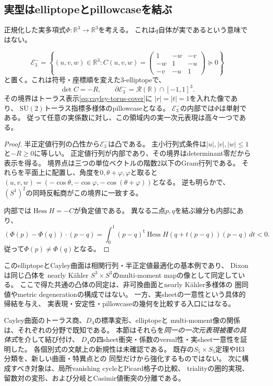 \subsection{実型はelliptopeとpillowcaseを結ぶ}
正規化した実多項式$\Phi:\mathbb R^3\to\mathbb R^3$を考える。
これは$q$自体が実であるという意味ではない。
\begin{proposition}[相関行列の凸領域と一意な実sheet]
\label{prop:elliptope-gradient-injective}
\[
 \mathcal E_3^-=
 \left\{(u,v,w)\in\mathbb R^3:
 C(u,v,w)=\begin{pmatrix}1&-w&-v\\-w&1&-u\\-v&-u&1\end{pmatrix}\succeq0\right\}
\]
と置く。これは符号・座標順を変えた$3$-elliptopeで、
\[
 \det C=-R,\qquad
 \partial\mathcal E_3^-=\mathcal R(\mathbb R)\cap[-1,1]^3.
\]
その境界はトーラス表示\eqref{eq:cayley-torus-cover}に
$|r|=|t|=1$を入れた像であり、
$\mathrm{SU}(2)$トーラス指標多様体のpillowcaseとなる。
$\mathcal E_3^-$の内部では$\Phi$は単射である。
従って任意の実係数に対し、この領域内の実一次元表現は高々一つである。
\end{proposition}
\begin{proof}
半正定値行列の凸性から$\mathcal E_3^-$は凸である。
主小行列式条件は$|u|,|v|,|w|\le1$と$-R\ge0$に等しい。
正定値行列が内部であり、その境界はdeterminant零だから表示を得る。
境界点は三つの単位ベクトルの階数$2$以下のGram行列である。
それらを平面上に配置し、角度を$0,\theta+\varphi,\varphi$と取ると
$(u,v,w)=(-\cos\theta,-\cos\varphi,-\cos(\theta+\varphi))$となる。
逆も明らかで、$(S^1)^2$の同時反転商がこの境界に一致する。

内部では$\operatorname{Hess}H=-C$が負定値である。
異なる二点$p,q$を結ぶ線分も内部にあり、
\[
 (\Phi(p)-\Phi(q))\cdot(p-q)
 =\int_0^1(p-q)^{\mathsf t}\operatorname{Hess}H(q+t(p-q))(p-q)\,dt<0.
\]
従って$\Phi(p)\ne\Phi(q)$となる。
\end{proof}

このelliptopeとCayley曲面は相関行列・半正定値最適化の基本例であり、
Dixon \cite[Lemma 3.5]{DixonElliptope}は同じ凸体を
nearly K\"ahler $S^3\times S^3$のmulti-moment mapの像として同定している。
ここで得た共通の凸体の同定は、非可換曲面とnearly K\"ahler多様体の
圏同値やmetric degenerationの構成ではない。
一方、実sheetの一意性という具体的帰結を与え、
実表現・安定性・pillowcaseの幾何を比較する入口にはなる。

\begin{remark}[確立した接続と研究の射程]
Cayley曲面のトーラス商、$D_4$の標準変形、elliptopeと
multi-moment像の関係は、それぞれの分野で既知である。
本節はそれらを\emph{同一の一次元表現被覆の具体式}を介して結び付け、
$D_4$の四sheet衝突・係数のversal性・実sheet一意性を証明した。
各個別式の文献上の新規性は未確認である。
既存の$S_5\times S_5$定理やH3分類を、新しい曲面・特異点との
同型だけから強化するものではない。
次に構成すべき対象は、局所vanishing cycleとPicard格子の比較、
trialityの圏的実現、留数対の変形、および分岐とCasimir値衝突の分離である。
\end{remark}
